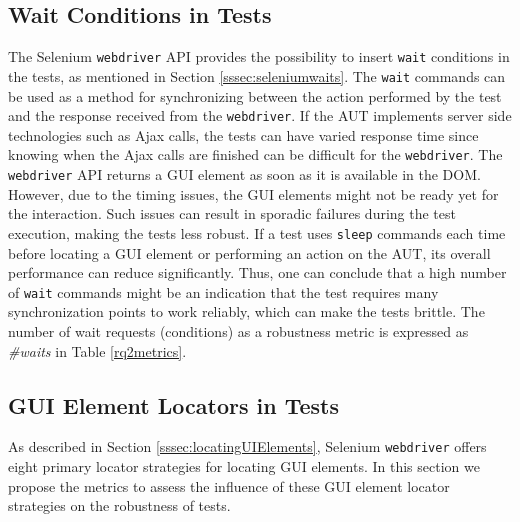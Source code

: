 \subsection{Wait Conditions in Tests}
\label{selenium-waits-metric}
The Selenium \texttt{webdriver} API provides the possibility to insert \texttt{wait} conditions in the tests, as mentioned in Section \ref{sssec:seleniumwaits}. The \texttt{wait} commands can be used as a method for synchronizing between the action performed by the test and the response received from the \texttt{webdriver}. If the AUT implements server side technologies such as Ajax calls, the tests can have varied response time since knowing when the Ajax calls are finished can be difficult for the \texttt{webdriver}. The \texttt{webdriver} API returns a GUI element as soon as it is available in the DOM. However, due to the timing issues, the GUI elements might not be ready yet for the interaction. Such issues can result in sporadic failures during the test execution, making the tests less robust. If a test uses \texttt{sleep} commands each time before locating a GUI element or performing an action on the AUT, its overall performance can reduce significantly. Thus, one can conclude that a high number of \texttt{wait} commands might be an indication that the test requires many synchronization points to work reliably, which can make the tests brittle. The number of wait requests (conditions) as a robustness metric is expressed as \textit{\#waits} in Table \ref{rq2metrics}.

\subsection{GUI Element Locators in Tests}
As described in Section \ref{sssec:locatingUIElements}, Selenium \texttt{webdriver} offers eight primary locator strategies for locating GUI elements. In this section we propose the metrics to assess the influence of these GUI element locator strategies on the robustness of tests.

